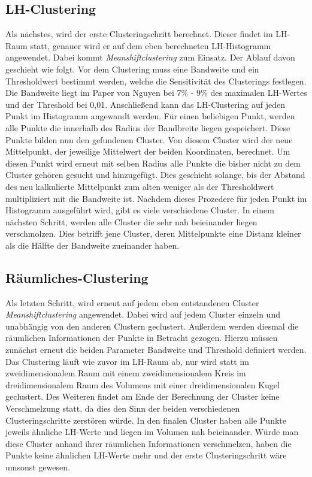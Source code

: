 \subsection{LH-Clustering}

Als nächstes, wird der erste Clusteringschritt berechnet. Dieser findet im LH-Raum statt, genauer wird er auf dem eben berechneten LH-Histogramm angewendet. Dabei kommt \textit{Meanshiftclustering} zum Einsatz. Der Ablauf davon geschieht wie folgt.
Vor dem Clustering muss eine Bandweite und ein Thresholdwert bestimmt werden, welche die Sensitivität des Clusterings festlegen. Die Bandweite liegt im Paper von Nguyen \cite{nguyen2012clustering} bei 7\% - 9\% des maximalen LH-Wertes und der Threshold bei 0,01. Anschließend kann das LH-Clustering auf jeden Punkt im Histogramm angewandt werden.
\newline
Für einen beliebigen Punkt, werden alle Punkte die innerhalb des Radius der Bandbreite liegen gespeichert. Diese Punkte bilden nun den gefundenen Cluster. Von diesem Cluster wird der neue Mittelpunkt, der jeweilige Mittelwert der beiden Koordinaten, berechnet. Um diesen Punkt wird erneut mit selben Radius alle Punkte die bisher nicht zu dem Cluster gehören gesucht und hinzugefügt. Dies geschieht solange, bis der Abstand des neu kalkulierte Mittelpunkt zum alten weniger als der Thresholdwert multipliziert mit die Bandweite ist. 
Nachdem dieses Prozedere für jeden Punkt im Histogramm ausgeführt wird, gibt es viele verschiedene Cluster. In einem nächsten Schritt, werden alle Cluster die sehr nah beieinander liegen verschmolzen. Dies betrifft jene Cluster, deren Mittelpunkte eine Distanz kleiner als die Hälfte der Bandweite zueinander haben.

\subsection{Räumliches-Clustering}

Als letzten Schritt, wird erneut auf jedem eben entstandenen Cluster \textit{Meanshiftclustering} angewendet. Dabei wird auf jedem Cluster einzeln und unabhängig von den anderen Clustern geclustert. Außerdem werden diesmal die räumlichen Informationen der Punkte in Betracht gezogen. Hierzu müssen zunächst erneut die beiden Parameter Bandweite und Threshold definiert werden. Das Clustering läuft wie zuvor im LH-Raum ab, nur wird statt im zweidimensionalem Raum mit einem zweidimensionalem Kreis im dreidimensionalem Raum des Volumens mit einer dreidimensionalen Kugel geclustert. Des Weiteren findet am Ende der Berechnung der Cluster keine Verschmelzung statt, da dies den Sinn der beiden verschiedenen Clusteringschritte zerstören würde. In den finalen Cluster haben alle Punkte jeweils ähnliche LH-Werte und liegen im Volumen nah beieinander. Würde man diese Cluster anhand ihrer räumlichen Informationen verschmelzen, haben die Punkte keine ähnlichen LH-Werte mehr und der erste Clusteringschritt wäre umsonst gewesen.







